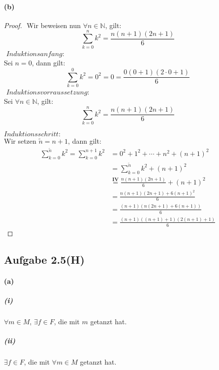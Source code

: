 \paragraph{(b)}
\begin{proof}
$ $\newline
Wir beweisen nun $\forall n\in\mathbb{N}$, gilt:
\begin{equation*}
\sum_{k=0}^{n}k^2=\frac{n(n+1)(2n+1)}{6}
\end{equation*}
$ $\newline
$Induktionsanfang:$\\
Sei $n=0$, dann gilt:
\begin{equation*}
\sum_{k=0}^{0}k^2=0^2=0=\frac{0(0+1)(2\cdot 0+1)}{6}
\end{equation*}
$ $\newline
$Induktionsvorraussetzung:$\\
Sei $\forall n\in\mathbb{N}$, gilt:
\begin{equation*}
\sum_{k=0}^{n}k^2=\frac{n(n+1)(2n+1)}{6}
\end{equation*}

\newpage

$Induktionsschritt:$\\
Wir setzen $\tilde{n}=n+1$, dann gilt:
\begin{align*}
\sum_{k=0}^{\tilde{n}}k^2=\sum_{k=0}^{n+1}k^2&=0^2+1^2+\cdots +n^2+(n+1)^2\\
&=\sum_{k=0}^{\tilde{n}}k^2+(n+1)^2\\
&\overset{\mathbf{IV}}{=}\frac{n(n+1)(2n+1)}{6}+(n+1)^2\\
&=\frac{n(n+1)(2n+1)+6(n+1)^2}{6}\\
&=\frac{(n+1)(n(2n+1)+6(n+1))}{6}\\
&=\frac{(n+1)((n+1)+1)(2(n+1)+1)}{6}
\end{align*}
\end{proof}

\newpage

\subsection{Aufgabe 2.5(H)}

\paragraph{(a)}

\subparagraph{(i)}
$\forall m\in M$, $\exists f\in F$, die mit $m$ getanzt hat.

\subparagraph{(ii)}
$\exists f\in F$, die mit $\forall m\in M$ getanzt hat.

